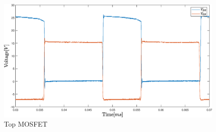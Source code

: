 \begin{figure}[H]
	\centering
	\includegraphics[width=\textwidth]{figures/06Testing/topswi60per.eps}
	\caption{Top MOSFET}
\end{figure}